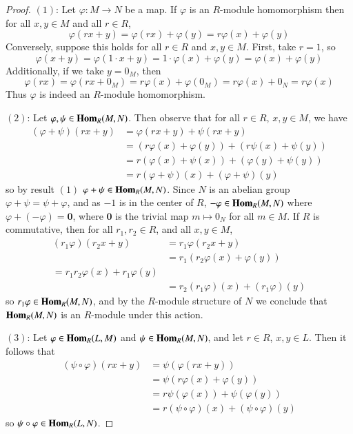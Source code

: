 \documentclass[12pt, a4paper, oneside, openright, titlepage]{book}
\begin{document}
\begin{proof}
    $(1)$: Let $\varphi:M\rightarrow N$ be a map. If $\varphi$ is an $R$-module homomorphism then for all $x,y \in M$ and all $r \in R$, $$\varphi(rx+y) = \varphi(rx)+\varphi(y) = r\varphi(x)+\varphi(y)$$ Conversely, suppose this holds for all $r \in R$ and $x,y \in M$. First, take $r = 1$, so $$\varphi(x+y) = \varphi(1\cdot x + y) = 1\cdot \varphi(x)+\varphi(y) = \varphi(x)+\varphi(y)$$ Additionally, if we take $y = 0_M$, then \begin{equation*}
        \varphi(rx) = \varphi(rx+0_M) = r\varphi(x)+\varphi(0_M) = r\varphi(x)+0_N = r\varphi(x)
    \end{equation*}
    Thus $\varphi$ is indeed an $R$-module homomorphism.

    $(2)$: Let $\varphi,\psi \in \mathbf{Hom}_R(M,N)$. Then observe that for all $r \in R$, $x,y \in M$, we have \begin{align*}
        (\varphi+\psi)(rx+y) &= \varphi(rx+y)+\psi(rx+y) \\
        &= (r\varphi(x)+\varphi(y))+(r\psi(x)+\psi(y)) \\
        &= r(\varphi(x)+\psi(x))+(\varphi(y)+\psi(y)) \\
        &= r(\varphi+\psi)(x)+(\varphi+\psi)(y)
    \end{align*}
    so by result $(1)$ $\varphi + \psi \in \mathbf{Hom}_R(M,N)$. Since $N$ is an abelian group $\varphi+\psi = \psi + \varphi$, and as $-1$ is in the center of $R$, $-\varphi \in \mathbf{Hom}_R(M,N)$ where $\varphi+(-\varphi) = \mathbf{0}$, where $\mathbf{0}$ is the trivial map $m \mapsto 0_N$ for all $m \in M$. If $R$ is commutative, then for all $r_1, r_2 \in R$, and all $x,y \in M$, \begin{align*}
        (r_1\varphi)(r_2x+y) &= r_1\varphi(r_2x+y) \\
        &= r_1(r_2\varphi(x)+\varphi(y)) \\
        = r_1r_2\varphi(x)+r_1\varphi(y) \\
        &= r_2(r_1\varphi)(x)+(r_1\varphi)(y)
    \end{align*}
    so $r_1\varphi \in \mathbf{Hom}_R(M,N)$, and by the $R$-module structure of $N$ we conclude that $\mathbf{Hom}_R(M,N)$ is an $R$-module under this action.

    $(3)$: Let $\varphi \in \mathbf{Hom}_R(L,M)$ and $\psi \in \mathbf{Hom}_R(M,N)$, and let $r \in R$, $x,y \in L$. Then it follows that \begin{align*}
        (\psi\circ \varphi)(rx+y) &= \psi(\varphi(rx+y)) \\
        &= \psi(r\varphi(x)+\varphi(y)) \\
        &= r\psi(\varphi(x)) + \psi(\varphi(y)) \\
        &= r(\psi\circ \varphi)(x)+(\psi\circ \varphi)(y)
    \end{align*}
    so $\psi \circ \varphi \in \mathbf{Hom}_R(L,N)$.



\end{proof}
\end{document}
